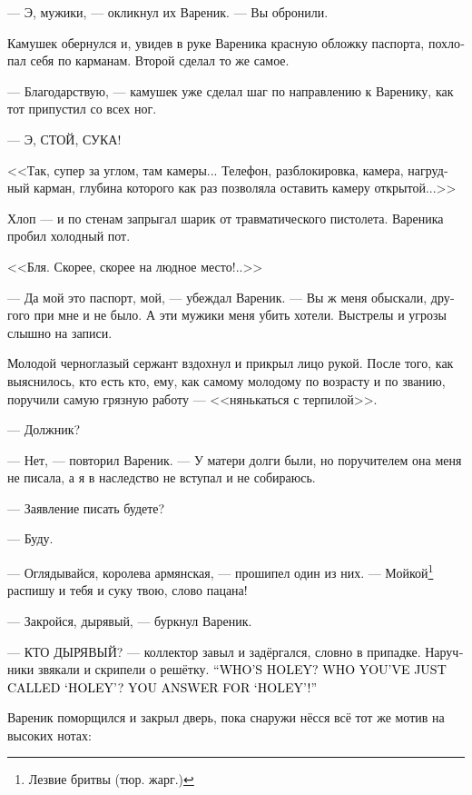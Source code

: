 \documentclass[a5paper,12pt,fleqn]{extbook}\usepackage{cooltooltips}\usepackage{polyglossia}\setdefaultlanguage[babelshorthands=true]{russian}\setotherlanguage{english}\defaultfontfeatures{Ligatures=TeX,Mapping=tex-text} \usepackage{xcolor}\definecolor{lightgray}{HTML}{bbbbbb}\color{lightgray}\newcommand{\ml}[3]{\textenglish{\textcolor{black}{#3}}}
\newcommand{\asterism}{\vspace{1em}{\centering\Large\bfseries$\ast~\ast~\ast$\par}\vspace{1em}}
\newcommand{\textspace}{\vspace{1em}{\centering\Large\bfseries<...>\par}\vspace{1em}}
\begin{document}
--- Э, мужики, --- окликнул их Вареник.
--- Вы обронили.

Камушек обернулся и, увидев в руке Вареника красную обложку паспорта, похлопал себя по карманам.
Второй сделал то же самое.

--- Благодарствую, --- камушек уже сделал шаг по направлению к Варенику, как тот припустил со всех ног.

--- Э, СТОЙ, СУКА!

<<Так, супер за углом, там камеры...
Телефон, разблокировка, камера, нагрудный карман, глубина которого как раз позволяла оставить камеру открытой...>>

Хлоп --- и по стенам запрыгал шарик от травматического пистолета.
Вареника пробил холодный пот.

<<Бля.
Скорее, скорее на людное место!..>>

\asterism

--- Да мой это паспорт, мой, --- убеждал Вареник.
--- Вы ж меня обыскали, другого при мне и не было.
А эти мужики меня убить хотели.
Выстрелы и угрозы слышно на записи.

Молодой черноглазый сержант вздохнул и прикрыл лицо рукой.
После того, как выяснилось, кто есть кто, ему, как самому молодому по возрасту и по званию, поручили самую грязную работу --- <<нянькаться с терпилой>>.

--- Должник?

--- Нет, --- повторил Вареник.
--- У матери долги были, но поручителем она меня не писала, а я в наследство не вступал и не собираюсь.

--- Заявление писать будете?

--- Буду.

\asterism

\textspace

--- Оглядывайся, королева армянская, --- прошипел один из них.
--- Мойкой\footnote{Лезвие бритвы (тюр. жарг.)} распишу и тебя и суку твою, слово пацана!

--- Закройся, дырявый, --- буркнул Вареник.

--- КТО ДЫРЯВЫЙ? --- коллектор завыл и задёргался, словно в припадке.
Наручники звякали и скрипели о решётку.
\ml{$0$}
{--- КТО ДЫРЯВЫЙ?}
{``WHO'S HOLEY?}
\ml{$0$}
{ТЫ КОГО ДЫРЯВЫМ НАЗВАЛ?}
{WHO YOU'VE JUST CALLED `HOLEY'?}
\ml{$0$}
{ОТВЕТИШЬ ЗА ДЫРЯВОГО!}
{YOU ANSWER FOR `HOLEY'!''}

\textspace

Вареник поморщился и закрыл дверь, пока снаружи нёсся всё тот же мотив на высоких нотах:
\end{document}
